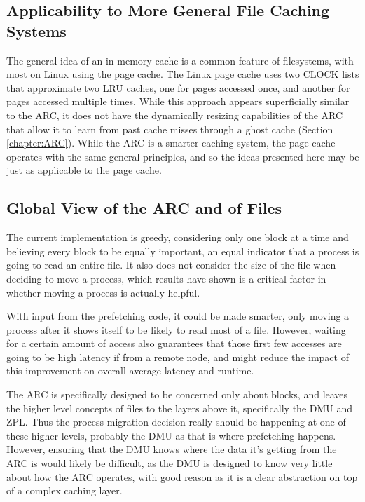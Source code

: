 \subsection{Applicability to More General File Caching Systems}
The general idea of an in-memory cache is a common feature of filesystems, with most on Linux using the page cache.
The Linux page cache uses two CLOCK lists that approximate two LRU caches, one for pages accessed once,
and another for pages accessed multiple times.
While this approach appears superficially similar to the ARC, it does not have the dynamically resizing capabilities of
the ARC that allow it to learn from past cache misses through a ghost cache (Section \ref{chapter:ARC}).
While the ARC is a smarter caching system, the page cache operates with the same general principles,
and so the ideas presented here may be just as applicable to the page cache.

\subsection{Global View of the ARC and of Files}
The current implementation is greedy, considering only one block at a time and believing every block to be equally important, an equal indicator that a process is going to read an entire file.
It also does not consider the size of the file when deciding to move a process,
which results have shown is a critical factor in whether moving a process is actually helpful.

With input from the prefetching code, it could be made smarter, 
only moving a process after it shows itself to be likely to read most of a file.
However, waiting for a certain amount of access also guarantees that those first few accesses are going to be high latency if from a remote node, and might reduce the impact of this improvement on overall average latency and runtime.

The ARC is specifically designed to be concerned only about blocks, and leaves the higher level concepts of
files to the layers above it, specifically the DMU and ZPL.
Thus the process migration decision really should be happening at one of these higher levels,
probably the DMU as that is where prefetching happens.
However, ensuring that the DMU knows where the data it's getting from the ARC is would likely be difficult,
as the DMU is designed to know very little about how the ARC operates, with good reason as it is a clear
abstraction on top of a complex caching layer.


